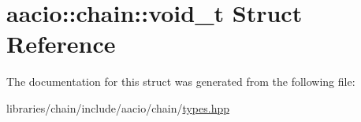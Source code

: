 \hypertarget{structaacio_1_1chain_1_1void__t}{}\section{aacio\+:\+:chain\+:\+:void\+\_\+t Struct Reference}
\label{structaacio_1_1chain_1_1void__t}


The documentation for this struct was generated from the following file\+:\begin{DoxyCompactItemize}
\item 
libraries/chain/include/aacio/chain/\mbox{\hyperlink{libraries_2chain_2include_2aacio_2chain_2types_8hpp}{types.\+hpp}}\end{DoxyCompactItemize}

